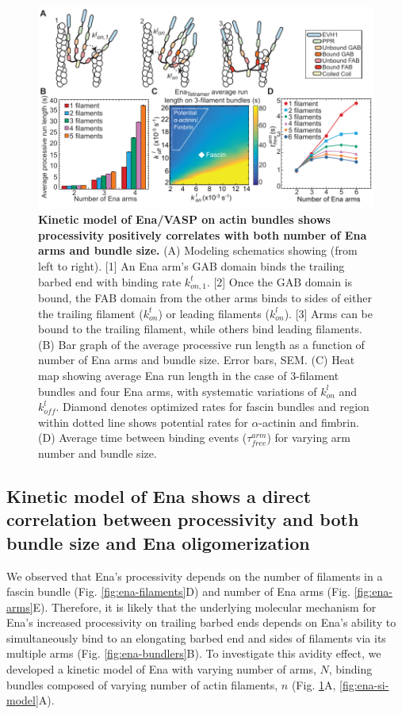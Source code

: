 \begin{figure}
\centering
\includegraphics[width=\textwidth]{img/ch02/Figure_5_elife.pdf}
\caption[Kinetic model of Ena/VASP on actin bundles shows processivity positively correlates with both number of Ena arms and bundle size.]{\textbf{Kinetic model of Ena/VASP on actin bundles shows processivity positively correlates with both number of Ena arms and bundle size.} (A) Modeling schematics showing (from left to right). [1] An Ena arm's GAB domain binds the trailing barbed end with binding rate $k^{t}_{on,1}$. [2] Once the GAB domain is bound, the FAB domain from the other arms binds to sides of either the trailing filament ($k^{t}_{on}$) or leading filaments ($k^{l}_{on}$). [3] Arms can be bound to the trailing filament, while others bind leading filaments. (B) Bar graph of the average processive run length as a function of number of Ena arms and bundle size. Error bars, SEM. (C) Heat map showing average Ena run length in the case of 3-filament bundles and four Ena arms, with systematic variations of $k^{l}_{on}$ and $k^{l}_{off}$. Diamond denotes optimized rates for fascin bundles and region within dotted line shows potential rates for $\alpha$-actinin and fimbrin. (D) Average time between binding events ($\tau_{free}^{arm}$) for varying arm number and bundle size.}
\label{fig:ena-model}
\end{figure}

\subsection{Kinetic model of Ena shows a direct correlation between processivity and both bundle size and Ena oligomerization}\label{ena-model}

We observed that Ena's processivity depends on the number of filaments in a fascin bundle (Fig. \ref{fig:ena-filaments}D) and number of Ena arms (Fig. \ref{fig:ena-arms}E). Therefore, it is likely that the underlying molecular mechanism for Ena's increased processivity on trailing barbed ends depends on Ena's ability to simultaneously bind to an elongating barbed end and sides of filaments via its multiple arms (Fig. \ref{fig:ena-bundlers}B). To investigate this avidity effect, we developed a kinetic model of Ena with varying number of arms, $N$, binding bundles composed of varying number of actin filaments, $n$ (Fig. \ref{fig:ena-model}A, \ref{fig:ena-si-model}A). 


